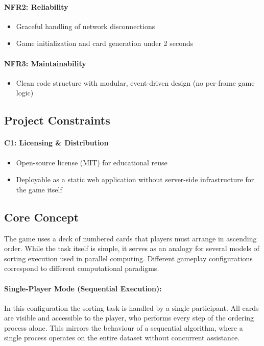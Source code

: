 \paragraph*{NFR2: Reliability}
\begin{itemize}
    \item Graceful handling of network disconnections
    \item Game initialization and card generation under 2 seconds
\end{itemize}

\paragraph*{NFR3: Maintainability}
\begin{itemize}
    \item Clean code structure with modular, event-driven design (no per-frame game logic)
\end{itemize}

\subsection{Project Constraints}
\label{subsec:project-constraints}

\paragraph*{C1: Licensing \& Distribution}
\begin{itemize}
    \item Open-source license (MIT) for educational reuse
    \item Deployable as a static web application without server-side infrastructure for the game itself
\end{itemize}


\subsection{Core Concept}
\label{subsec:core-concept}

The game uses a deck of numbered cards that players must arrange in ascending order. While the task itself is simple, it serves as an analogy for several models of sorting execution used in parallel computing. Different gameplay configurations correspond to different computational paradigms.

\paragraph*{Single-Player Mode (Sequential Execution):}
In this configuration the sorting task is handled by a single participant. All cards are visible and accessible to the player, who performs every step of the ordering process alone. This mirrors the behaviour of a sequential algorithm, where a single process operates on the entire dataset without concurrent assistance.

